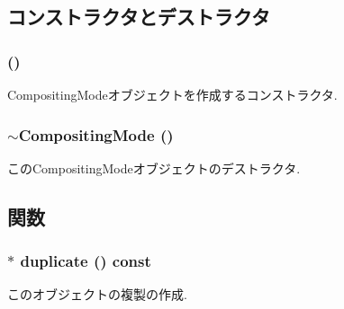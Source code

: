 \subsection{コンストラクタとデストラクタ}
\hypertarget{classm3g_1_1CompositingMode_5abfd1a798f1327aac4b92f55d4ecc0c}{
\subsubsection[{CompositingMode}]{ ()}}
\label{classm3g_1_1CompositingMode_5abfd1a798f1327aac4b92f55d4ecc0c}


CompositingModeオブジェクトを作成するコンストラクタ. \hypertarget{classm3g_1_1CompositingMode_0bba5b15be7249e946c9aaf94631ce3b}{
\subsubsection[{$\sim$CompositingMode}]{\setlength{\rightskip}{0pt plus 5cm}$\sim${\bf CompositingMode} ()}}
\label{classm3g_1_1CompositingMode_0bba5b15be7249e946c9aaf94631ce3b}


このCompositingModeオブジェクトのデストラクタ. 

\subsection{関数}
\hypertarget{classm3g_1_1CompositingMode_ab6fcd945b68728bbe2c65a8f45dc8dd}{
\subsubsection[{duplicate}]{ $\ast$ duplicate () const}}
\label{classm3g_1_1CompositingMode_ab6fcd945b68728bbe2c65a8f45dc8dd}


このオブジェクトの複製の作成. 

